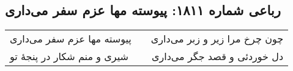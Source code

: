 \begin{center}
\section*{رباعی شماره ۱۸۱۱: پیوسته مها عزم سفر می‌داری}
\label{sec:1811}
\begin{longtable}{l p{0.5cm} r}
پیوسته مها عزم سفر می‌داری
&&
چون چرخ مرا زیر و زبر می‌داری
\\
شیری و منم شکار در پنجهٔ تو
&&
دل خوردئی و قصد جگر می‌داری
\\
\end{longtable}
\end{center}
